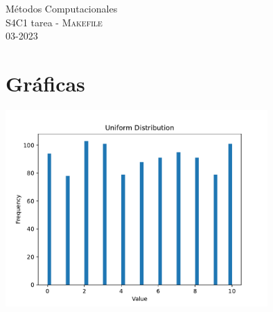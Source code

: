 \documentclass[11pt,letterpaper]{exam}
\begin{document}
\begin{center}
{\Large Métodos Computacionales} \\
S4C1 tarea - \textsc{Makefile}\\
03-2023\\
\end{center}


\noindent
\section{Gr\'aficas}
\begin{center}
\includegraphics[width=10cm]{histogramas.pdf}
\end{center}
\end{document}
